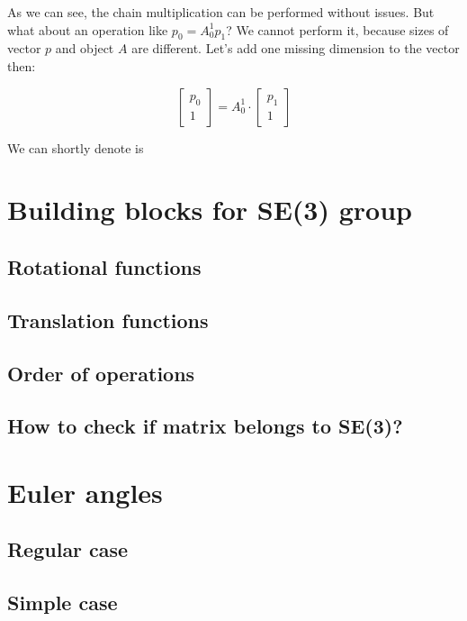 \documentclass[12pt, a4paper]{extarticle}
\begin{document}
	As we can see, the chain multiplication can be performed without issues. But what about an operation like $p_0 = A^1_0 p_1$? We cannot perform it, because sizes of vector $p$ and object $A$ are different. Let's add one missing dimension to the vector then:

	\begin{equation}\label{key}
		\begin{bmatrix}
			p_0 \\ 1
		\end{bmatrix} =
		A^1_0 \cdot
		\begin{bmatrix}
			p_1 \\ 1
		\end{bmatrix}
	\end{equation}

	We can shortly denote is

	\section{Building blocks for SE(3) group}

	\subsection{Rotational functions}

	\subsection{Translation functions}

	\subsection{Order of operations}

	\subsection{How to check if matrix belongs to SE(3)?}

	\section{Euler angles}

	\subsection{Regular case}

	\subsection{Simple case}
\end{document}

